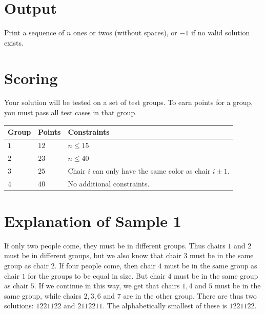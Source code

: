 \section*{Output}
Print a sequence of $n$ ones or twos (without spaces), or $-1$ if no valid solution exists.

\section*{Scoring}
Your solution will be tested on a set of test groups.
To earn points for a group, you must pass all test cases in that group.

\noindent
\begin{tabular}{| l | l | l |}
  \hline
  \textbf{Group} & \textbf{Points} & \textbf{Constraints} \\ \hline
  $1$     & $12$         & $n \leq 15$\\ \hline
  $2$     & $23$         & $n \leq 40$ \\ \hline
  $3$     & $25$         & Chair $i$ can only have the same color as chair $i\pm 1$. \\ \hline
  $4$     & $40$         & No additional constraints. \\ \hline
\end{tabular}

\section*{Explanation of Sample 1}
If only two people come, they must be in different groups.
Thus chairs $1$ and $2$ must be in different groups, but we also know that chair $3$
must be in the same group as chair $2$. If four people come, then chair $4$
must be in the same group as chair $1$ for the groups to be equal in size. But chair $4$ must
be in the same group as chair $5$. If we continue in this way, we get that chairs $1, 4$
and $5$ must be in the same group, while chairs $2, 3, 6$ and $7$ are in the other group.
There are thus two solutions: $1221122$ and $2112211$. The alphabetically smallest of
these is $1221122$.
